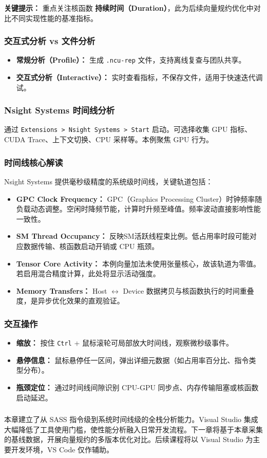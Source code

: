 \textbf{关键提示：} 重点关注核函数 \textbf{持续时间（Duration）}，此为后续向量规约优化中对比不同实现性能的基准指标。

\subsubsection{交互式分析 vs 文件分析}
\begin{itemize}
    \item \textbf{常规分析（Profile）：} 生成 \texttt{.ncu-rep} 文件，支持离线复查与团队共享。
    \item \textbf{交互式分析（Interactive）：} 实时查看指标，不保存文件，适用于快速迭代调试。
\end{itemize}

\subsubsection{Nsight Systems 时间线分析}
通过 \texttt{Extensions > Nsight Systems > Start} 启动。可选择收集 GPU 指标、CUDA Trace、上下文切换、CPU 采样等。本例聚焦 GPU 行为。

\subsubsection{时间线核心解读}
Nsight Systems 提供毫秒级精度的系统级时间线，关键轨道包括：
\begin{itemize}
    \item \textbf{GPC Clock Frequency：} GPC（Graphics Processing Cluster）时钟频率随负载动态调整。空闲时降频节能，计算时升频至峰值。频率波动直接影响性能一致性。
    \item \textbf{SM Thread Occupancy：} 反映SM活跃线程束比例。低占用率时段可能对应数据传输、核函数启动开销或 CPU 瓶颈。
    \item \textbf{Tensor Core Activity：} 本例向量加法未使用张量核心，故该轨道为零值。若启用混合精度计算，此处将显示活动强度。
    \item \textbf{Memory Transfers：} Host $\leftrightarrow$ Device 数据拷贝与核函数执行的时间重叠度，是异步优化效果的直观验证。
\end{itemize}

\subsubsection{交互操作}
\begin{itemize}
    \item \textbf{缩放：} 按住 \texttt{Ctrl} + 鼠标滚轮可局部放大时间线，观察微秒级事件。
    \item \textbf{悬停信息：} 鼠标悬停任一区间，弹出详细元数据（如占用率百分比、指令类型分布）。
    \item \textbf{瓶颈定位：} 通过时间线间隙识别 CPU-GPU 同步点、内存传输阻塞或核函数启动延迟。
\end{itemize}

\subsubsection*{}
本章建立了从 SASS 指令级到系统时间线级的全栈分析能力。Visual Studio 集成大幅降低了工具使用门槛，使性能分析融入日常开发流程。下一章将基于本章采集的基线数据，开展向量规约的多版本优化对比。后续课程将以 Visual Studio 为主要开发环境，VS Code 仅作辅助。

